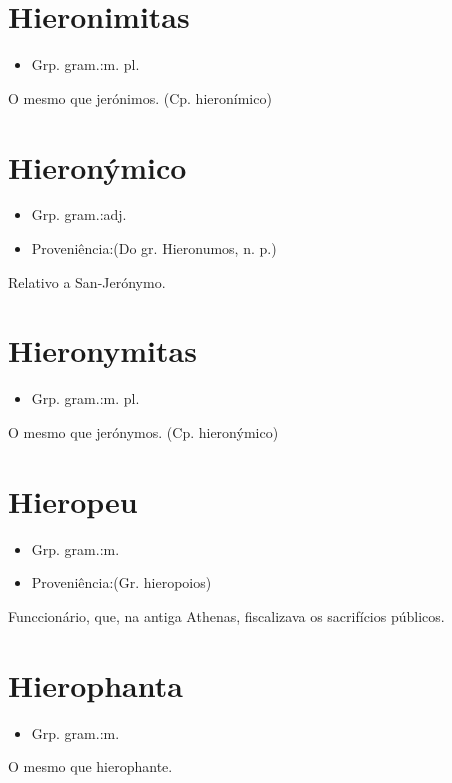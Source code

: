 \documentclass{article}
\begin{document}
\section{Hieronimitas}
\begin{itemize}
\item {Grp. gram.:m. pl.}
\end{itemize}
O mesmo que \textunderscore jerónimos\textunderscore .
(Cp. \textunderscore hieronímico\textunderscore )
\section{Hieronýmico}
\begin{itemize}
\item {Grp. gram.:adj.}
\end{itemize}
\begin{itemize}
\item {Proveniência:(Do gr. \textunderscore Hieronumos\textunderscore , n. p.)}
\end{itemize}
Relativo a San-Jerónymo.
\section{Hieronymitas}
\begin{itemize}
\item {Grp. gram.:m. pl.}
\end{itemize}
O mesmo que \textunderscore jerónymos\textunderscore .
(Cp. \textunderscore hieronýmico\textunderscore )
\section{Hieropeu}
\begin{itemize}
\item {Grp. gram.:m.}
\end{itemize}
\begin{itemize}
\item {Proveniência:(Gr. \textunderscore hieropoios\textunderscore )}
\end{itemize}
Funccionário, que, na antiga Athenas, fiscalizava os sacrifícios públicos.
\section{Hierophanta}
\begin{itemize}
\item {Grp. gram.:m.}
\end{itemize}
O mesmo que \textunderscore hierophante\textunderscore .
\end{document}
